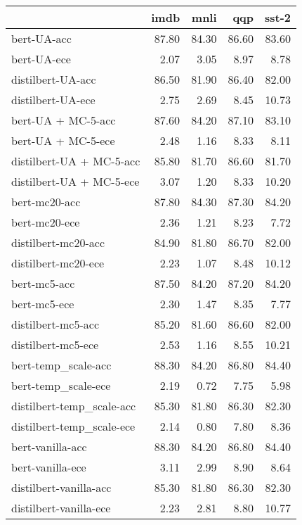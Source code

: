 \begin{tabular}{lrrrr}
\toprule
{} &   imdb &   mnli &    qqp &  sst-2 \\
\midrule
bert-UA-acc               &  87.80 &  84.30 &  86.60 &  83.60 \\
bert-UA-ece               &   2.07 &   3.05 &   8.97 &   8.78 \\
distilbert-UA-acc         &  86.50 &  81.90 &  86.40 &  82.00 \\
distilbert-UA-ece         &   2.75 &   2.69 &   8.45 &  10.73 \\
bert-UA + MC-5-acc        &  87.60 &  84.20 &  87.10 &  83.10 \\
bert-UA + MC-5-ece        &   2.48 &   1.16 &   8.33 &   8.11 \\
distilbert-UA + MC-5-acc  &  85.80 &  81.70 &  86.60 &  81.70 \\
distilbert-UA + MC-5-ece  &   3.07 &   1.20 &   8.33 &  10.20 \\
bert-mc20-acc             &  87.80 &  84.30 &  87.30 &  84.20 \\
bert-mc20-ece             &   2.36 &   1.21 &   8.23 &   7.72 \\
distilbert-mc20-acc       &  84.90 &  81.80 &  86.70 &  82.00 \\
distilbert-mc20-ece       &   2.23 &   1.07 &   8.48 &  10.12 \\
bert-mc5-acc              &  87.50 &  84.20 &  87.20 &  84.20 \\
bert-mc5-ece              &   2.30 &   1.47 &   8.35 &   7.77 \\
distilbert-mc5-acc        &  85.20 &  81.60 &  86.60 &  82.00 \\
distilbert-mc5-ece        &   2.53 &   1.16 &   8.55 &  10.21 \\
bert-temp\_scale-acc       &  88.30 &  84.20 &  86.80 &  84.40 \\
bert-temp\_scale-ece       &   2.19 &   0.72 &   7.75 &   5.98 \\
distilbert-temp\_scale-acc &  85.30 &  81.80 &  86.30 &  82.30 \\
distilbert-temp\_scale-ece &   2.14 &   0.80 &   7.80 &   8.36 \\
bert-vanilla-acc          &  88.30 &  84.20 &  86.80 &  84.40 \\
bert-vanilla-ece          &   3.11 &   2.99 &   8.90 &   8.64 \\
distilbert-vanilla-acc    &  85.30 &  81.80 &  86.30 &  82.30 \\
distilbert-vanilla-ece    &   2.23 &   2.81 &   8.80 &  10.77 \\
\bottomrule
\end{tabular}
